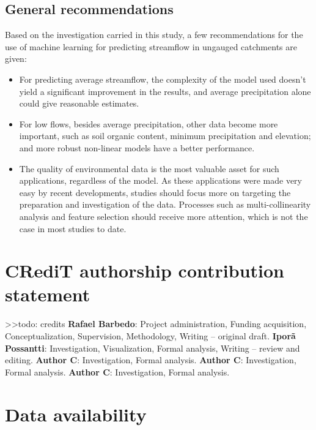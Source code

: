 \documentclass[12pt]{article}
\begin{document}
\subsection{General recommendations} \label{discussion:recommend}

Based on the investigation carried in this study, a few recommendations for the use of machine learning for predicting streamflow in ungauged catchments are given:
\begin{itemize}
    \item For predicting average streamflow, the complexity of the model used doesn’t yield a significant improvement in the results, and average precipitation alone could give reasonable estimates.
\end{itemize}

\begin{itemize}
    \item For low flows, besides average precipitation, other data become more important, such as soil organic content, minimum precipitation and elevation; and more robust non-linear models have a better performance.
\end{itemize}

\begin{itemize}
    \item The quality of environmental data is the most valuable asset for such applications, regardless of the model. As these applications were made very easy by recent developments, studies should focus more on targeting the preparation and investigation of the data. Processes such as multi-collinearity analysis and feature selection should receive more attention, which is not the case in most studies to date.
\end{itemize}

\section*{CRediT authorship contribution statement}

\noindent 
>>todo: credits
\textbf{Rafael Barbedo}: Project administration, Funding acquisition, Conceptualization, Supervision, Methodology, Writing – original draft. \textbf{Iporã Possantti}: Investigation, Visualization, Formal analysis, Writing – review and editing. \textbf{Author C}: Investigation, Formal analysis. \textbf{Author C}: Investigation, Formal analysis. \textbf{Author C}: Investigation, Formal analysis.

\section*{Data availability}
\end{document}
